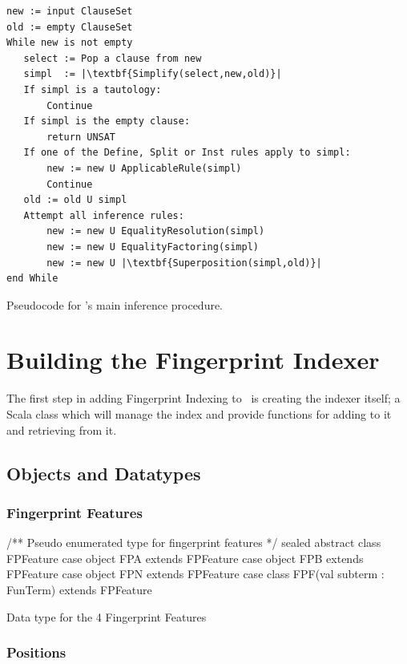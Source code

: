 \begin{listing}[H]
\begin{lstlisting}
new := input ClauseSet
old := empty ClauseSet
While new is not empty
   select := Pop a clause from new
   simpl  := |\textbf{Simplify(select,new,old)}|
   If simpl is a tautology:
       Continue
   If simpl is the empty clause:
       return UNSAT
   If one of the Define, Split or Inst rules apply to simpl:
       new := new U ApplicableRule(simpl)
       Continue
   old := old U simpl
   Attempt all inference rules:
       new := new U EqualityResolution(simpl)
       new := new U EqualityFactoring(simpl)
       new := new U |\textbf{Superposition(simpl,old)}|
end While
\end{lstlisting}
\caption{Pseudocode for \beagle's main inference procedure.}
\label{lst:main}
\end{listing}


\section{Building the Fingerprint Indexer}
\label{sec:initial}

The first step in adding Fingerprint Indexing to \beagle\ is creating the indexer
itself; a Scala class which will manage the index and provide functions for adding
to it and retrieving from it. 

\subsection{Objects and Datatypes}
\label{sec:datatypes}

\subsubsection{Fingerprint Features}

\begin{listing}[H]
\begin{scalacode}
/** Pseudo enumerated type for fingerprint features */
sealed abstract class FPFeature
case object FPA extends FPFeature 
case object FPB extends FPFeature
case object FPN extends FPFeature
case class  FPF(val subterm : FunTerm) extends FPFeature
\end{scalacode}
\caption{Data type for the 4 Fingerprint Features \protect\cite[p5]{shulz12}}
\label{lst:featuredata}
\end{listing}

\subsubsection{Positions}


